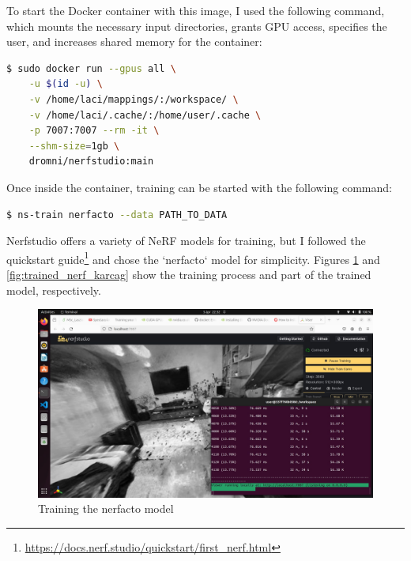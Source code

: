 To start the Docker container with this image, I used the following command, which mounts the necessary input directories, grants GPU access, specifies the user, and increases shared memory for the container:

\FloatBarrier
\begin{lstlisting}[language=bash,frame=single,float=!ht]
$ sudo docker run --gpus all \
    -u $(id -u) \
    -v /home/laci/mappings/:/workspace/ \
    -v /home/laci/.cache/:/home/user/.cache \
    -p 7007:7007 --rm -it \
    --shm-size=1gb \
    dromni/nerfstudio:main
\end{lstlisting}

Once inside the container, training can be started with the following command:
\begin{lstlisting}[language=bash,frame=single,float=!ht]
$ ns-train nerfacto --data PATH_TO_DATA
\end{lstlisting}

Nerfstudio offers a variety of NeRF models for training, but I followed the quickstart guide\footnote{\url{https://docs.nerf.studio/quickstart/first_nerf.html}} and chose the `nerfacto` model for simplicity. Figures \ref{fig:training_nerf_karcag} and \ref{fig:trained_nerf_karcag} show the training process and part of the trained model, respectively.

\begin{figure}[htbp]
	\centering
	\includegraphics[width=150mm, keepaspectratio]{figures_jpg/nerfstudio.jpg}
	\caption{Training the nerfacto model}
	\label{fig:training_nerf_karcag}
\end{figure}

